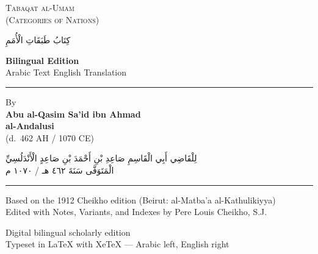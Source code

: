 \documentclass[11pt,a4paper]{article}
\newcommand{\ar}[1]{\arabicfont\beginR #1\endR}
\newcommand{\shortline}{\noindent\rule{0.5\textwidth}{0.4pt}\par}
\begin{document}

\thispagestyle{empty}
\begin{center}
\vspace*{1.5cm}

{\Huge\color{titlecolor}\textsc{Tabaqat al-Umam}}\\[0.3cm]
{\Large\color{titlecolor}\textsc{(Categories of Nations)}}

\vspace{1cm}

{\large\color{titlecolor}\ar{كِتَابُ طَبَقَاتِ الْأُمَمِ}}

\vspace{1.5cm}

{\large\textbf{Bilingual Edition}}\\[0.3cm]
{\normalsize Arabic Text \textbullet{} English Translation}

\vspace{1.5cm}

\shortline

\vspace{1cm}

{\large By}\\[0.3cm]
{\LARGE\textbf{Abu al-Qasim Sa'id ibn Ahmad\\al-Andalusi}}\\[0.3cm]
{\normalsize (d.~462 AH / 1070 CE)}

\vspace{1.5cm}

{\large\ar{لِلْقَاضِي أَبِي الْقَاسِمِ صَاعِدِ بْنِ أَحْمَدَ بْنِ صَاعِدٍ الْأَنْدَلُسِيِّ}}\\[0.3cm]
{\normalsize\ar{الْمَتَوَفَّى سَنَةَ ٤٦٢ هـ / ١٠٧٠ م}}

\vspace{1.5cm}

\shortline

\vspace{0.8cm}

{\normalsize Based on the 1912 Cheikho edition (Beirut: al-Matba'a al-Kathulikiyya)}\\[0.2cm]
{\small Edited with Notes, Variants, and Indexes by Pere Louis Cheikho, S.J.}

\vspace{1cm}

{\small Digital bilingual scholarly edition\\
Typeset in LaTeX with XeTeX --- Arabic left, English right}

\vspace*{1.5cm}
\end{center}
\end{document}
